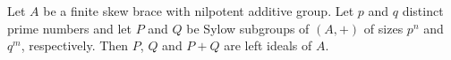 



\begin{lemma}
    \label{lem:sylow_leftideals}
    Let $A$ be a finite skew brace with nilpotent additive group. Let $p$
    and $q$ distinct prime numbers and let $P$ and $Q$ be Sylow subgroups of
    $(A,+)$ of sizes $p^n$ and $q^m$, respectively. Then $P$, $Q$ and $P+Q$ are
    left ideals of $A$.
\end{lemma}

